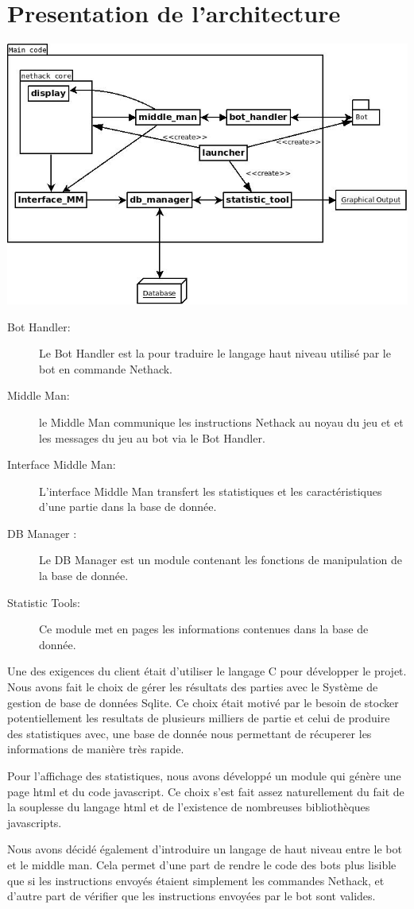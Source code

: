 \section{Presentation de l'architecture}

\includegraphics[width=140mm]{Images/new_archi.jpeg}

\begin{description}
\item[Bot Handler: ] Le Bot Handler est la pour traduire le langage haut niveau utilisé par le bot en commande Nethack.
\item[Middle Man: ] le Middle Man communique les instructions Nethack au noyau du jeu et et les messages du jeu au bot via le Bot Handler.
\item[Interface Middle Man: ] L'interface Middle Man transfert les statistiques et les caractéristiques d'une partie dans la base de donnée.
\item[DB Manager :] Le DB Manager est un module contenant les fonctions de manipulation de la base de donnée.
\item[Statistic Tools:] Ce module met en pages les informations contenues dans la base de donnée.  
\end{description}

Une des exigences du client était d'utiliser le langage C pour développer le projet. Nous avons fait le choix de gérer les résultats des parties avec le Système de gestion de base de données Sqlite. Ce choix était motivé par le besoin de stocker potentiellement les resultats de plusieurs milliers de partie et celui de produire des statistiques avec, une base de donnée nous permettant de récuperer les informations de manière très rapide.

Pour l'affichage des statistiques, nous avons développé un module qui génère une page html et du code javascript. Ce choix s'est fait assez naturellement du fait de la souplesse du langage html et de l'existence de  nombreuses bibliothèques javascripts. 

Nous avons décidé également d'introduire un langage de haut niveau entre le bot et le middle man. Cela permet d'une part de rendre le code des bots plus lisible que si les instructions envoyés étaient simplement les commandes Nethack, et d'autre part de vérifier que les instructions envoyées par le bot sont valides. 
